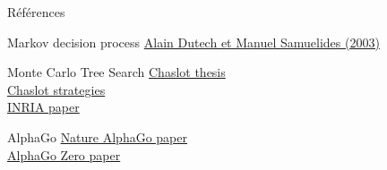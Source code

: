 \begin{frame}[fragile]{Références}
    \begin{block}{Markov decision process}
        \href{https://members.loria.fr/ADutech/Papier/dutech_selectifPOMDP_RIA03.pdf}{Alain Dutech et Manuel Samuelides (2003)}
    \end{block}
    \begin{block}{Monte Carlo Tree Search}
        \href{https://project.dke.maastrichtuniversity.nl/games/files/phd/Chaslot_thesis.pdf}{Chaslot thesis}\\
        \href{https://helios2.mi.parisdescartes.fr/~bouzy/publications/Chaslot-MCStrategiesComputerGo-BNAIC06.pdf}{Chaslot strategies}\\
        \href{https://hal.inria.fr/inria-00116992/document}{INRIA paper}
    \end{block}
    \begin{block}{AlphaGo}
        \href{https://www.nature.com/articles/nature16961#citeas}{Nature AlphaGo paper}\\
        \href{https://arxiv.org/abs/1712.01815}{AlphaGo Zero paper}
    \end{block}
\end{frame}